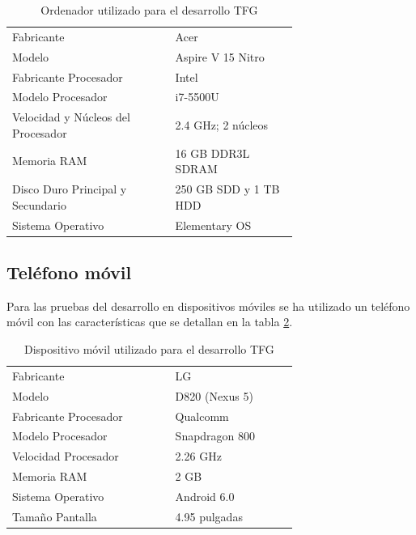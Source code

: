 	\begin{table}[H]
	  \centering 
	  \begin{tabular}{p{0.4\linewidth}p{0.3\linewidth}}
	    \toprule
	    Fabricante 							& Acer 											\\
	    Modelo								& Aspire V 15 Nitro								\\
		Fabricante Procesador 				& Intel 										\\
		Modelo Procesador 					& i7-5500U 										\\
		Velocidad y Núcleos del Procesador & 2.4 GHz; 2 núcleos 							\\
		Memoria RAM 						& 16 \ac{GB} \ac{DDR}3L \ac{SDRAM} 			\\
		Disco Duro Principal y Secundario 	& 250 \ac{GB} \ac{SDD} y 1 \ac{TB} \ac{HDD}	\\
		Sistema Operativo					& Elementary \ac{OS} 							\\
	    \hline
	  \end{tabular}
	  \caption{Ordenador utilizado para el desarrollo \ac{TFG}}
	  \label{tab:portatil}
	\end{table}
	
	\subsection{Teléfono móvil}
	
	Para las pruebas del desarrollo en dispositivos móviles se ha utilizado un teléfono móvil con las características que se detallan en la tabla \ref{tab:movil}.
	
	\begin{table}[H]
	  \centering 
	  \begin{tabular}{p{0.4\linewidth}p{0.3\linewidth}}
	    \toprule
	    Fabricante 				& LG 				\\
	    Modelo 					& D820 (Nexus 5) 	\\
		Fabricante Procesador 	& Qualcomm 			\\
		Modelo Procesador 		& Snapdragon 800 	\\
		Velocidad Procesador 	& 2.26 GHz 			\\
		Memoria RAM 			& 2 \ac{GB} 		\\
		Sistema Operativo 		& Android 6.0 		\\
		Tamaño Pantalla			& 4.95 pulgadas 	\\
	    \hline
	  \end{tabular}
	  \caption{Dispositivo móvil utilizado para el desarrollo \ac{TFG}}
	  \label{tab:movil}
	\end{table}

